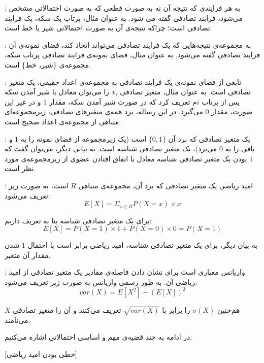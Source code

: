 
 :
به هر فرایندی که نتیجه آن نه به صورت قطعی که به صورت احتمالاتی مشخص می‌شود، فرایند تصادفی گفته می شود. به عنوان مثال، پرتاب یک سکه، یک فرایند تصادفی است؛ چراکه نتیجه‌ی آن به صورت احتمالاتی شیر یا خط است. 

 :
به مجموعه‌ی نتیجه‌هایی که یک فرایند تصادفی می‌تواند اتخاذ کند، فضای نمونه‌ی آن فرایند تصادفی گفته می‌شود. به عنوان مثال، فضای نمونه‌ی فرایند تصادفی پرتاب سکه، مجموعه‌ی \{شیر، خط\} است.

 :
تابعی از فضای نمونه‌ی یک فرایند تصادفی به مجموعه‌ی اعداد حقیقی، یک متغیر تصادفی است. به عنوان مثال، متغیر تصادفی $x_i$ را می‌توان معادل با شیر آمدن سکه پس از پرتاب $i$م  تعریف کرد که در صورت شیر آمدن سکه، مقدار $1$ و در غیر این صورت، مقدار $0$ می‌گیرد. در این رساله، برد همه‌ی متغیر‌های تصادفی، زیر‌مجموعه‌ای متناهی از مجموعه‌ی اعداد صحیح است.

 :
یک متغیر تصادفی که برد آن $\{0, 1\}$ است (یک زیر‌مجموعه از فضای نمونه را به $1$ و باقی را به $0$ می‌برد)، یک متغیر تصادفی شناسه است. به بیانی دیگر، می‌توان گفت که $1$ بودن یک متغیر تصادفی شناسه معادل با اتفاق افتادن عضوی از زیر‌مجموعه‌ی مورد نظر است.

 :
امید ریاضی یک متغیر تصادفی که برد آن، مجموعه‌ی متناهی $R$ است، به صورت زیر تعریف می‌شود:
$$E[X] = \Sigma_{x \in R} P(X=x) \times x$$

برای یک متغیر تصادفی شناسه بنا به تعریف داریم:
$$E[X] = P(X=1)\times 1 + P(X=0)\times 0 = P(X=1)$$

به بیان دیگر، برای یک متغیر تصادفی شناسه، امید ریاضی برابر است با احتمال $1$ شدن مقدار آن متغیر.

 :
واریانس معیاری است برای نشان دادن فاصله‌ی مقادیر یک متغیر تصادفی از امید ریاضی آن. به طور رسمی واریانس به صورت زیر تعریف می‌شود: 
$$var(X) = E[X^2] - {{(E[X])}^2}$$

هم‌چنین $\sigma(X)$ را برابر با $\sqrt{var(X)}$ تعریف می‌کنند و آن را  متغیر تصادفی $X$ می‌نامند.

%

در ادامه به چند قضیه‌ی مهم و اساسی احتمالاتی اشاره می‌کنیم:

[خطی بودن امید ریاضی]
\label{theorem:expected-value}

